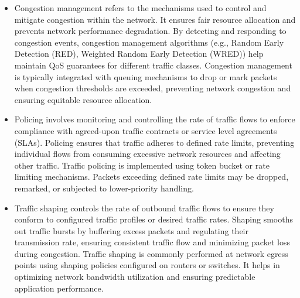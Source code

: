 \documentclass{article}
\begin{document}
\begin{itemize}
	\item[] Congestion management refers to the mechanisms used to control and mitigate congestion within the network. It ensures fair resource allocation and prevents network performance degradation. By detecting and responding to congestion events, congestion management algorithms (e.g., Random Early Detection (RED), Weighted Random Early Detection (WRED)) help maintain QoS guarantees for different traffic classes. Congestion management is typically integrated with queuing mechanisms to drop or mark packets when congestion thresholds are exceeded, preventing network congestion and ensuring equitable resource allocation.
	\item[] Policing involves monitoring and controlling the rate of traffic flows to enforce compliance with agreed-upon traffic contracts or service level agreements (SLAs). Policing ensures that traffic adheres to defined rate limits, preventing individual flows from consuming excessive network resources and affecting other traffic. Traffic policing is implemented using token bucket or rate limiting mechanisms. Packets exceeding defined rate limits may be dropped, remarked, or subjected to lower-priority handling.
	\item[] Traffic shaping controls the rate of outbound traffic flows to ensure they conform to configured traffic profiles or desired traffic rates. Shaping smooths out traffic bursts by buffering excess packets and regulating their transmission rate, ensuring consistent traffic flow and minimizing packet loss during congestion. Traffic shaping is commonly performed at network egress points using shaping policies configured on routers or switches. It helps in optimizing network bandwidth utilization and ensuring predictable application performance.

\end{itemize}
\end{document}
